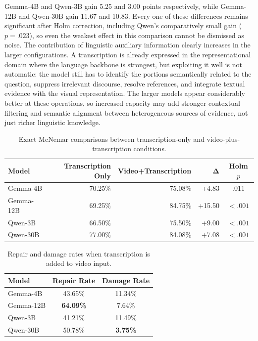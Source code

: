 Gemma-4B    and Qwen-3B gain 5.25 and 3.00 points respectively, while Gemma-12B and Qwen-30B gain 11.67 and 10.83. Every one of these differences remains significant after Holm correction, including Qwen's comparatively small gain ($p=.023$), so even the weakest effect in this comparison cannot be dismissed as noise.
The contribution of linguistic auxiliary information clearly increases in the larger configurations. A transcription is already expressed in the representational domain where the language backbone is strongest, but exploiting it well is not automatic: the model still has to identify the portions semantically related to the question, suppress irrelevant discourse, resolve references, and integrate textual evidence with the visual representation. The larger models appear considerably better at these operations, so increased capacity may add stronger contextual filtering and semantic alignment between heterogeneous sources of evidence, not just richer linguistic knowledge.
\begin{table}[ht]
    \centering
    \small
    \begin{tabular}{lrrrc}
        \hline
        \textbf{Model} &
        \textbf{Transcription Only} &
        \textbf{Video+Transcription} &
        $\boldsymbol{\Delta}$ &
        \textbf{Holm $p$} \\
        \hline
        Gemma-4B          & 70.25\% & 75.08\% & +4.83 & .011 \\
        Gemma-12B & 69.25\% & 84.75\% & +15.50 & $<.001$ \\
        Qwen-3B        & 66.50\% & 75.50\% & +9.00 & $<.001$ \\
        Qwen-30B    & 77.00\% & 84.08\% & +7.08 & $<.001$ \\
        \hline
    \end{tabular}
    \caption{Exact McNemar comparisons between transcription-only and video-plus-transcription conditions.}
    \label{tab:mcnemar_transcription_video}
\end{table}
\begin{table}[ht]
    \centering
    \small
    \begin{tabular}{lcc}
        \hline
        \textbf{Model} &
        \textbf{Repair Rate} &
        \textbf{Damage Rate} \\
        \hline
        Gemma-4B    & 43.65\% & 11.34\% \\
        Gemma-12B & \textbf{64.09\%} & 7.64\% \\
        Qwen-3B & 41.21\% & 11.49\% \\
        Qwen-30B & 50.78\% & \textbf{3.75\%} \\
        \hline
    \end{tabular}
    \caption{Repair and damage rates when transcription is added to video input.}
    \label{tab:transcription_repair_damage}
\end{table}
